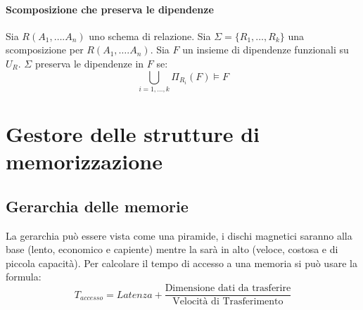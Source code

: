 \documentclass[12pt, a4paper]{report}
\begin{document}
    \subsubsection{Scomposizione che preserva le dipendenze}
    Sia $R(A_{1},\ldots.A_{n})$ uno schema di relazione. Sia $\Sigma = \{R_{1},\ldots,R_{k}\}$ una scomposizione per $R(A_{1},\ldots.A_{n})$. Sia $F$ un insieme di dipendenze funzionali su $U_{R}$. $\Sigma$ preserva le dipendenze in $F$ se:
    \begin{equation*}
        \bigcup_{i=1,\ldots,k}\Pi_{R_{i}}(F) \models F
    \end{equation*}
    \chapter{Gestore delle strutture di memorizzazione}
    \section{Gerarchia delle memorie}
    La gerarchia può essere vista come una piramide, i dischi magnetici saranno alla base (lento, economico e capiente) mentre la  sarà in alto (veloce, costosa e di piccola capacità). Per calcolare il tempo di accesso a una memoria si può usare la formula:
    \begin{equation*}
        T_{accesso} = Latenza + \frac{\text{Dimensione dati da trasferire}}{\text{Velocità di Trasferimento}}
    \end{equation*}
\end{document}
